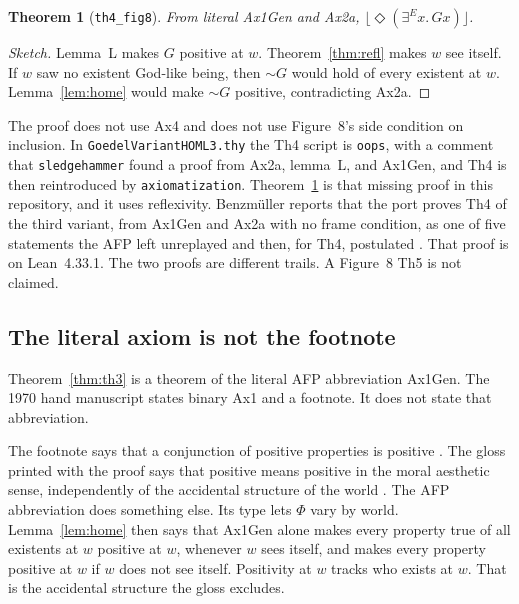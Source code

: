 \documentclass[11pt,a4paper]{article}
\newcommand{\valid}[1]{\lfloor #1 \rfloor}
\newcommand{\Pos}{\Diamond}
\newcommand{\exE}{\exists^{E}}
\newcommand{\lean}[1]{\texttt{#1}}
\newtheorem{theorem}{Theorem}
\theoremstyle{definition}
\theoremstyle{remark}
\begin{document}
\begin{theorem}[\lean{th4\_fig8}]
\label{thm:th4fig8}
From literal Ax1Gen and Ax2a,
\(\valid{\Pos(\exE x.\, G x)}\).
\end{theorem}

\begin{proof}[Sketch]
Lemma~L makes \(G\) positive at \(w\).
Theorem~\ref{thm:refl} makes \(w\) see itself.
If \(w\) saw no existent God-like being, then \(\sim G\) would hold of every
existent at \(w\).
Lemma~\ref{lem:home} would make \(\sim G\) positive, contradicting Ax2a.
\end{proof}

The proof does not use Ax4 and does not use Figure~8's side condition on
inclusion.
In \lean{GoedelVariantHOML3.thy} the Th4 script is \lean{oops}, with a comment
that \lean{sledgehammer} found a proof from Ax2a, lemma~L, and Ax1Gen, and
Th4 is then reintroduced by \lean{axiomatization}.
Theorem~\ref{thm:th4fig8} is that missing proof in this repository, and it
uses reflexivity.
Benzm\"uller reports that the port proves Th4 of the third variant, from
Ax1Gen and Ax2a with no frame condition, as one of five statements the AFP
left unreplayed and then, for Th4, postulated \cite{benzmuellerLean2026}.
That proof is on Lean~4.33.1.
The two proofs are different trails.
A Figure~8 Th5 is not claimed.

\subsection{The literal axiom is not the footnote}
\label{sec:gloss}

Theorem~\ref{thm:th3} is a theorem of the literal AFP abbreviation Ax1Gen.
The 1970 hand manuscript states binary Ax1 and a footnote.
It does not state that abbreviation.

The footnote says that a conjunction of positive properties is positive
\cite{goedel1995,benzmueller2026}.
The gloss printed with the proof says that positive means positive in the
moral aesthetic sense, independently of the accidental structure of the world
\cite{goedel1995}.
The AFP abbreviation does something else.
Its type lets \(\Phi\) vary by world.
Lemma~\ref{lem:home} then says that Ax1Gen alone makes every property true of
all existents at \(w\) positive at \(w\), whenever \(w\) sees itself, and makes
every property positive at \(w\) if \(w\) does not see itself.
Positivity at \(w\) tracks who exists at \(w\).
That is the accidental structure the gloss excludes.
\end{document}

